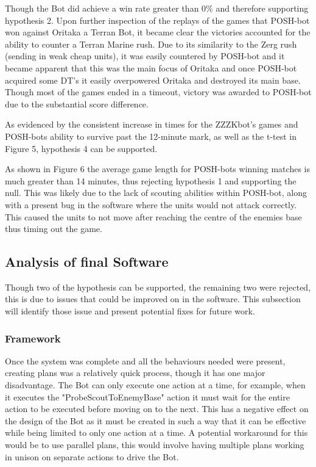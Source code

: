 \documentclass[journal]{IEEEtran}
\begin{document}
	Though the Bot did achieve a win rate greater than 0\% and therefore supporting hypothesis 2. Upon further inspection of the replays of the games that POSH-bot won against Oritaka a Terran Bot, it became clear the victories accounted for the ability to counter a Terran Marine rush. Due to its similarity to the Zerg rush (sending in weak cheap units), it was easily countered by POSH-bot and it became apparent that this was the main focus of Oritaka and once POSH-bot acquired some DT's it easily overpowered Oritaka and destroyed its main base. Though most of the games ended in a timeout, victory was awarded to POSH-bot due to the substantial score difference.
	
	As evidenced by the consistent increase in times for the ZZZKbot's games and POSH-bots ability to survive past the 12-minute mark, as well as the t-test in Figure 5, hypothesis 4 can be supported. 
	
	As shown in Figure 6 the average game length for POSH-bots winning matches is much greater than 14 minutes, thus rejecting hypothesis 1 and supporting the null. This was likely due to the lack of scouting abilities within POSH-bot, along with a present bug in the software where the units would not attack correctly. This caused the units to not move after reaching the centre of the enemies base thus timing out the game.
	
	\subsection{Analysis of final Software}
	Though two of the hypothesis can be supported, the remaining two were rejected, this is due to issues that could be improved on in the software. This subsection will identify those issue and present potential fixes for future work.
	\newline
	
	\subsubsection{Framework}    
	Once the system was complete and all the behaviours needed were present, creating plans was a relatively quick process, though it has one major disadvantage. The Bot can only execute one action at a time, for example, when it executes the "ProbeScoutToEnemyBase" action it must wait for the entire action to be executed before moving on to the next. This has a negative effect on the design of the Bot as it must be created in such a way that it can be effective while being limited to only one action at a time. A potential workaround for this would be to use parallel plans, this would involve having multiple plans working in unison on separate actions to drive the Bot.    
	
\end{document}
